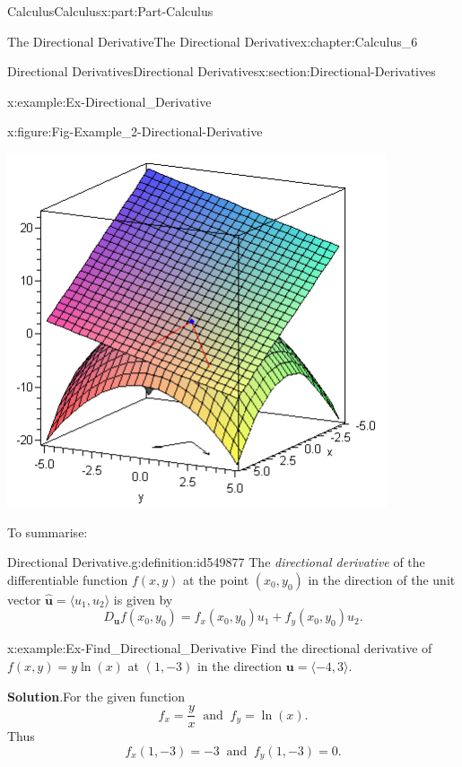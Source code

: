 \documentclass[oneside,10pt,]{book}
\newcommand{\blocktitlefont}{\relax}
\numberwithin{equation}{section}
\newcommand{\bm}[1]{\boldsymbol{#1}}
\begin{document}
\begin{partptx}{Calculus}{}{Calculus}{}{}{x:part:Part-Calculus}
\begin{chapterptx}{The Directional Derivative}{}{The Directional Derivative}{}{}{x:chapter:Calculus_6}
\begin{sectionptx}{Directional Derivatives}{}{Directional Derivatives}{}{}{x:section:Directional-Derivatives}
\begin{example}{}{x:example:Ex-Directional_Derivative}
\begin{figureptx}{}{x:figure:Fig-Example_2-Directional-Derivative}{}
\begin{image}{0.15}{0.7}{0.15}
\includegraphics[width=\linewidth]{./Calculus/Images/6/Directional_Derivative_Example.png}
\end{image}%
\tcblower
\end{figureptx}%
\end{example}
To summarise:%
\begin{definition}{Directional Derivative.}{g:definition:id549877}%
The \emph{directional derivative} of the differentiable function \(f(x,y)\) at the point \((x_0,y_0)\) in the direction of the unit vector \(\hat{\bm{u}} = \langle u_1, u_2 \rangle\) is given by%
\begin{equation*}
D_{\bm{u}} f(x_0,y_0) = f_x(x_0,y_0)u_1 + f_y (x_0,y_0)u_2\text{.}
\end{equation*}
%
\end{definition}
\begin{example}{}{x:example:Ex-Find_Directional_Derivative}%
Find the directional derivative of \(f(x,y) = y\ln(x)\) at \((1,-3)\) in the direction \(\bm{u} = \langle -4, 3 \rangle\).%
\par\smallskip%
\noindent\textbf{\blocktitlefont Solution}.\hypertarget{g:solution:id549906}{}\quad{}For the given function%
\begin{equation*}
f_x = \dfrac{y}{x} \: \text{ and } \: f_y = \ln(x)\text{.}
\end{equation*}
Thus%
\begin{equation*}
f_x(1,-3) = -3 \: \text{ and } \: f_y(1,-3) = 0\text{.}

\end{equation*}
\end{example}
\end{sectionptx}
\end{chapterptx}
\end{partptx}
\end{document}
